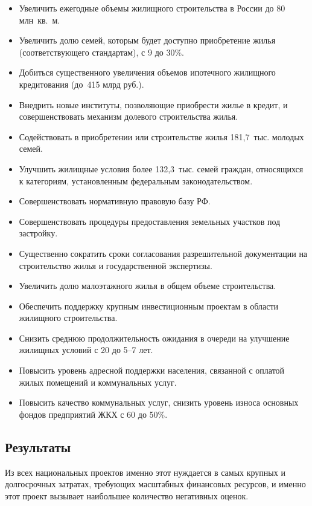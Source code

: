 \documentclass[article, 12pt, russian, oneside]{ncc}
\begin{document}
\begin{itemize}
\item Увеличить ежегодные объемы жилищного строительства в России до
  80 млн~кв.~м.
\item Увеличить долю семей, которым будет доступно приобретение жилья
  (соответствующего стандартам), с 9 до 30\%.
\item Добиться существенного увеличения объемов ипотечного жилищного
  кредитования (до~415 млрд руб.).
\item Внедрить новые институты, позволяющие приобрести жилье в кредит,
  и совершенствовать механизм долевого строительства жилья.
\item Содействовать в приобретении или строительстве жилья
  181,7~тыс. молодых семей.
\item Улучшить жилищные условия более 132,3~тыс. семей граждан,
  относящихся к категориям, установленным федеральным
  законодательством.
\item Совершенствовать нормативную правовую базу РФ.
\item Совершенствовать процедуры предоставления земельных участков под
  застройку.
\item Существенно сократить сроки согласования разрешительной
  документации на строительство жилья и государственной экспертизы.
\item Увеличить долю малоэтажного жилья в общем объеме строительства.
\item Обеспечить поддержку крупным инвестиционным проектам в области
  жилищного строительства.
\item Снизить среднюю продолжительность ожидания в очереди на
  улучшение жилищных условий с 20 до 5--7 лет.
\item Повысить уровень адресной поддержки населения, связанной с
  оплатой жилых помещений и коммунальных услуг.
\item Повысить качество коммунальных услуг, снизить уровень износа
  основных фондов предприятий ЖКХ с 60 до 50\%.
\end{itemize}

\subsection{Результаты}

Из всех национальных проектов именно этот нуждается в самых крупных и
долгосрочных затратах, требующих масштабных финансовых ресурсов, и
именно этот проект вызывает наибольшее количество негативных оценок.
\end{document}

